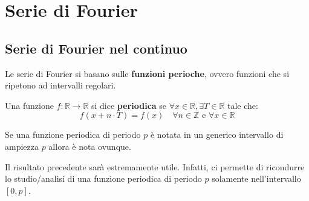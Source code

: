 \chapter{Serie di Fourier}
\section{Serie di Fourier nel continuo}
Le serie di Fourier si basano sulle \textbf{funzioni perioche}, ovvero funzioni che
si ripetono ad intervalli regolari.
\begin{definizione}
    Una funzione $f:\mathbb{R}\to \mathbb{R}$ si dice \textbf{periodica} se
    $\forall x\in \mathbb{R}, \exists T \in \mathbb{R}$ tale che:
    \begin{equation}
        f(x+n \cdot T) = f(x) \quad \forall n \in \mathbb{Z} \text{ e } \forall x \in \mathbb{R}
    \end{equation}
\end{definizione}
\begin{proposizione}
    Se una funzione periodica di periodo $p$ è notata in un generico intervallo
    di ampiezza $p$ allora è nota ovunque.
\end{proposizione}
Il risultato precedente sarà estremamente utile. Infatti, ci permette di ricondurre
lo studio/analisi di una funzione periodica di periodo $p$ solamente nell'intervallo
$[0, p]$.
